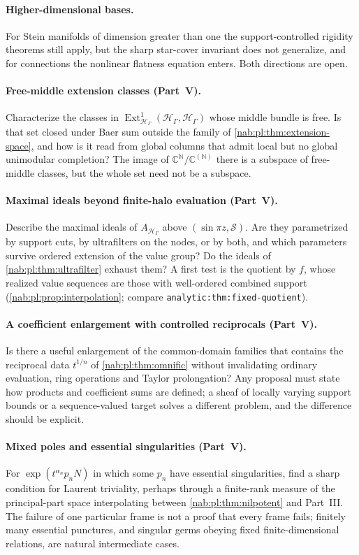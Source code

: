 \documentclass[11pt,letterpaper]{article}
\theoremstyle{definition}
\theoremstyle{remark}
\newcommand{\C}{\mathbb C}
\newcommand{\N}{\mathbb N}
\newcommand{\HH}{\mathscr H_\Gamma}
\newcommand{\Ext}{\operatorname{Ext}}
\numberwithin{equation}{section}
\begin{document}
\paragraph{Higher-dimensional bases.}
For Stein manifolds of dimension greater than one the support-controlled
rigidity theorems still apply, but the sharp star-cover invariant does not
generalize, and for connections the nonlinear flatness equation enters. Both
directions are open.

\paragraph{Free-middle extension classes (Part~V).}
Characterize the classes in $\Ext^1_{\HH}(\HH,\HH)$ whose middle bundle is
free. Is that set closed under Baer sum outside the family of
\cref{nab:pl:thm:extension-space}, and how is it read from global columns that
admit local but no global unimodular completion? The image of
$\C^{\N}/\C^{(\N)}$ there is a subspace of free-middle classes, but the whole
set need not be a subspace.

\paragraph{Maximal ideals beyond finite-halo evaluation (Part~V).}
Describe the maximal ideals of $A_{\HH}$ above $(\sin\pi z,\mathcal S)$. Are
they parametrized by support cuts, by ultrafilters on the nodes, or by both, and
which parameters survive ordered extension of the value group? Do the ideals of
\cref{nab:pl:thm:ultrafilter} exhaust them? A first test is the quotient by
$f$, whose realized value sequences are those with well-ordered combined support
(\cref{nab:pl:prop:interpolation}; compare \nolinkurl{analytic:thm:fixed-quotient}).

\paragraph{A coefficient enlargement with controlled reciprocals (Part~V).}
Is there a useful enlargement of the common-domain families that contains the
reciprocal data $t^{1/n}$ of \cref{nab:pl:thm:omnific} without invalidating
ordinary evaluation, ring operations and Taylor prolongation? Any proposal must
state how products and coefficient sums are defined; a sheaf of locally varying
support bounds or a sequence-valued target solves a different problem, and the
difference should be explicit.

\paragraph{Mixed poles and essential singularities (Part~V).}
For $\exp(t^{\alpha_n}p_nN)$ in which some $p_n$ have essential singularities,
find a sharp condition for Laurent triviality, perhaps through a finite-rank
measure of the principal-part space interpolating between
\cref{nab:pl:thm:nilpotent} and Part~III. The failure of one particular frame is
not a proof that every frame fails; finitely many essential punctures, and
singular germs obeying fixed finite-dimensional relations, are natural
intermediate cases.
\end{document}
